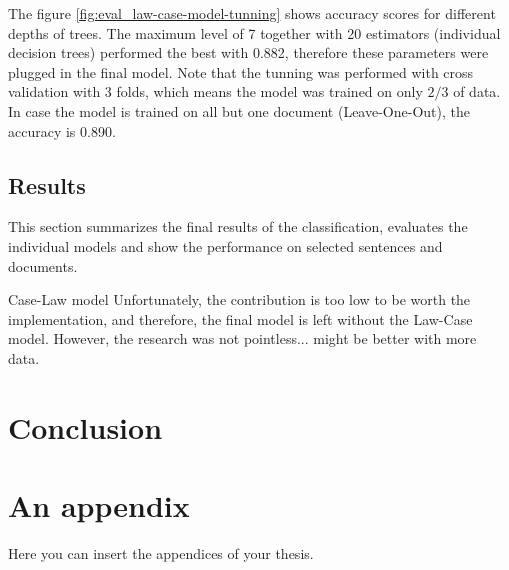 \documentclass[
  digital, %
  notable,   %
  nolof,     %
  nolot,     %
]{fithesis3}
\begin{document}
The figure \ref{fig:eval_law-case-model-tunning} shows accuracy scores for different depths of trees.
The maximum level of 7 together with 20 estimators (individual decision trees) performed the best with 0.882, therefore these parameters were plugged in the final model.
Note that the tunning was performed with cross validation with 3 folds, which means the model was trained on only $2/3$ of data.
In case the model is trained on all but one document (Leave-One-Out), the accuracy is 0.890.

\section{Results}
This section summarizes the final results of the classification, evaluates the individual models and show the performance on selected sentences and documents.

Case-Law model
Unfortunately, the contribution is too low to be worth the implementation, and therefore, the final model is left without the Law-Case model. However, the research was not pointless... might be better with more data.



\chapter{Conclusion}







  \printbibliography[heading=bibintoc] %

  \makeatletter\thesis@blocks@clear\makeatother
  \printindex

\appendix %
\chapter{An appendix}
Here you can insert the appendices of your thesis.
\end{document}
